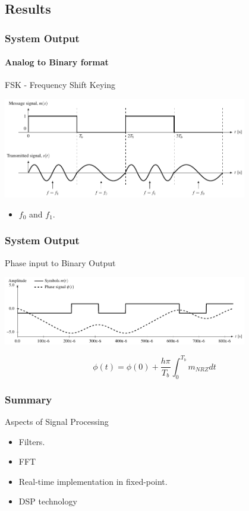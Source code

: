 \subsection{Results}
\begin{frame} \frametitle{System Output}
    \framesubtitle{Analog to Binary format}
    \begin{block}{FSK - Frequency Shift Keying}    
        \begin{center}
            \includegraphics[width=0.8\textwidth]{img/gfsk_basics}
        \end{center}
        \begin{itemize}
            \item $f_0$ and $f_1$.
        \end{itemize}
    \end{block}
\end{frame}
%
\begin{frame}\frametitle{System Output}
    \begin{block}{Phase input to Binary Output} 
        \begin{center}
            \includegraphics[width=0.8\textwidth]{img/gfsk_integration} 
        \end{center}
        \begin{equation}
            \phi(t) = \phi(0) + \frac{h \pi}{T_b}\int_0^{T_b} m_{NRZ}dt
        \end{equation}
    \end{block}
\end{frame}

\begin{frame}\frametitle{Summary}
    \begin{block}{Aspects of Signal Processing} 
     \begin{itemize}
         \item Filters.
         \item FFT
         \item Real-time implementation in fixed-point.
         \item DSP technology
     \end{itemize}
    \end{block}
\end{frame}

